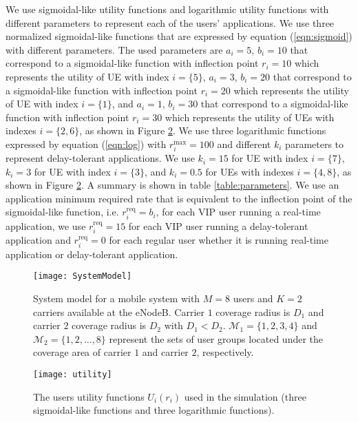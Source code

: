 \documentclass[journal]{IEEEtran} 				\IEEEoverridecommandlockouts 						\usepackage{amsmath,amssymb}
\begin{document}
We use sigmoidal-like utility functions and logarithmic utility functions with different parameters to represent each of the users' applications. We use three normalized sigmoidal-like functions that are expressed by equation (\ref{eqn:sigmoid}) with different parameters. The used parameters are $a_i = 5$, $b_i=10$ that correspond to a sigmoidal-like function with inflection point $r_i =10$ which represents the utility of UE with index $i=\{5\}$, $a_i = 3$, $b_i=20$ that correspond to a sigmoidal-like function with inflection point $r_i=20$ which represents the utility of UE with index $i=\{1\}$, and $a_i = 1$,  $b_i=30$ that correspond to a sigmoidal-like function with inflection point $r_i=30$ which represents the utility of UEs with indexes $i=\{2,6\}$, as shown in Figure \ref{fig:utility}. We use three logarithmic functions expressed by equation (\ref{eqn:log}) with $r_i^{\text{max}} =100$ and different $k_i$ parameters to represent delay-tolerant applications. We use $k_i =15$ for UE with index $i=\{7\}$, $k_i =3$ for UE with index $i=\{3\}$, and $k_i = 0.5$ for UEs with indexes $i=\{4,8\}$, as shown in Figure \ref{fig:utility}. A summary is shown in table \ref{table:parameters}. We use an application minimum required rate that is equivalent to the inflection point of the sigmoidal-like function, i.e. $r_i^{\text{req}}=b_i$, for each VIP user running a real-time application, we use $r_i^{\text{req}}=15$ for each VIP user running a delay-tolerant application and $r_i^{\text{req}}=0$ for each regular user whether it is running real-time application or delay-tolerant application.
\begin{figure}[tb]
\centering
\texttt{[image: SystemModel]}
\caption{System model for a mobile system with $M=8$ users and $K=2$ carriers available at the eNodeB. Carrier $1$ coverage radius is $D_1$ and carrier $2$ coverage radius is $D_2$ with $D_1 < D_2$. $\mathcal{M}_1=\{1,2,3,4\}$ and $\mathcal{M}_2=\{1,2,...,8\}$ represent the sets of user groups located under the coverage area of carrier $1$ and carrier $2$, respectively.}
\label{fig:SystemModel}
\end{figure}
\begin{figure}[tb]
\centering
\texttt{[image: utility]}
\caption{The users utility functions $U_i(r_i)$ used in the simulation (three sigmoidal-like functions and three logarithmic functions).}
\label{fig:utility}
\end{figure}
\end{document}
